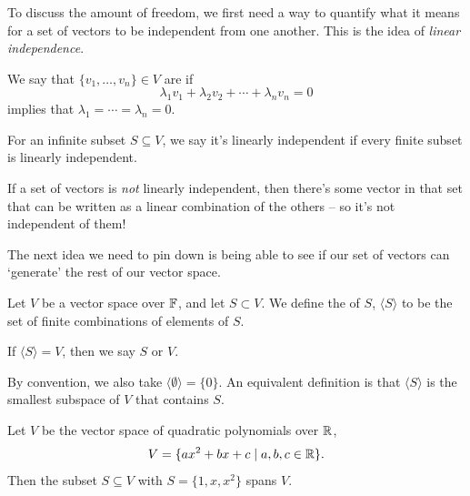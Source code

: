 \documentclass[a4paper]{scrartcl}
\begin{document}
To discuss the amount of freedom, we first need a way to quantify what it means for a set of vectors to be independent from one another. This is the idea of \emph{linear independence}.


\begin{definition}
We say that $\{v_1, \dots, v_n\} \in V$ are  if
$$
\lambda_1 v_1 + \lambda_2 v_2 + \cdots + \lambda_n v_n = 0
$$
implies that $\lambda_1 = \cdots = \lambda_n = 0$.
\end{definition}

\begin{remark}
    For an infinite subset $S \subseteq V$, we say it's linearly independent if every finite subset is linearly independent.
\end{remark}

If a set of vectors is \emph{not} linearly independent, then there's some vector in that set that can be written as a linear combination of the others -- so it's not independent of them!

The next idea we need to pin down is being able to see if our set of vectors can `generate' the rest of our vector space. 


\begin{definition}[Span]
    Let $V$ be a vector space over $\mathbb{F}$, and let $S \subset V$. We define the  of $S$, $\langle S \rangle$ to be the set of finite combinations of elements of $S$.

    If $\langle S \rangle = V$, then we say $S$  or  $V$.
\end{definition}

\begin{remark}
    By convention, we also take $\langle \emptyset \rangle = \{ 0\}$. An equivalent definition is that $\langle S \rangle$ is the smallest subspace of $V$ that contains $S$.
\end{remark}

\begin{example}
    Let $V$ be the vector space of quadratic polynomials over $\mathbb{R}$, 
    $$V = \{ax^2 + bx + c \mid a, b, c \in \mathbb{R}\}.$$ 
    Then the subset $S \subseteq V$ with $S = \{1, x, x^2\}$ spans $V$.
\end{example}

\end{document}
